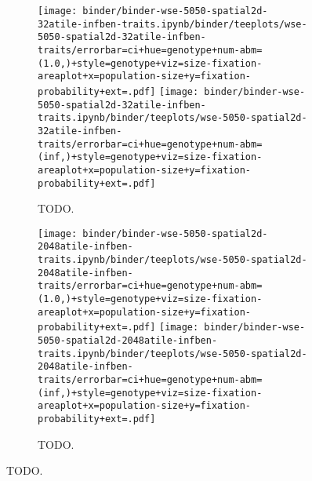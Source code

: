 \begin{figure}[h]
  \begin{subfigure}[b]{\linewidth}
    \texttt{[image: binder/binder-wse-5050-spatial2d-32atile-infben-traits.ipynb/binder/teeplots/wse-5050-spatial2d-32atile-infben-traits/errorbar=ci+hue=genotype+num-abm=(1.0,)+style=genotype+viz=size-fixation-areaplot+x=population-size+y=fixation-probability+ext=.pdf]}
    \texttt{[image: binder/binder-wse-5050-spatial2d-32atile-infben-traits.ipynb/binder/teeplots/wse-5050-spatial2d-32atile-infben-traits/errorbar=ci+hue=genotype+num-abm=(inf,)+style=genotype+viz=size-fixation-areaplot+x=population-size+y=fixation-probability+ext=.pdf]}
    \caption{\footnotesize TODO.}
    \label{fig:wse-inf-one:32}
  \end{subfigure}
  \begin{subfigure}[b]{\linewidth}
    \texttt{[image: binder/binder-wse-5050-spatial2d-2048atile-infben-traits.ipynb/binder/teeplots/wse-5050-spatial2d-2048atile-infben-traits/errorbar=ci+hue=genotype+num-abm=(1.0,)+style=genotype+viz=size-fixation-areaplot+x=population-size+y=fixation-probability+ext=.pdf]}
    \texttt{[image: binder/binder-wse-5050-spatial2d-2048atile-infben-traits.ipynb/binder/teeplots/wse-5050-spatial2d-2048atile-infben-traits/errorbar=ci+hue=genotype+num-abm=(inf,)+style=genotype+viz=size-fixation-areaplot+x=population-size+y=fixation-probability+ext=.pdf]}
    \caption{\footnotesize TODO.}
    \label{fig:wse-inf-one:2048}
  \end{subfigure}
  \caption{TODO.}
    \label{fig:wse-inf-one}
\end{figure}
